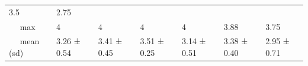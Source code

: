 \documentclass[
  english,
  man,floatsintext]{apa6}
\begin{document}
\begin{longtable}[]{@{}lllllll@{}}
\begin{minipage}[t]{0.11\columnwidth}
3.5\strut
\end{minipage} & \begin{minipage}[t]{0.11\columnwidth}\raggedright
2.75\strut
\end{minipage}\tabularnewline
\begin{minipage}[t]{0.16\columnwidth}\raggedright
~~ max\strut
\end{minipage} & \begin{minipage}[t]{0.11\columnwidth}\raggedright
4\strut
\end{minipage} & \begin{minipage}[t]{0.11\columnwidth}\raggedright
4\strut
\end{minipage} & \begin{minipage}[t]{0.11\columnwidth}\raggedright
4\strut
\end{minipage} & \begin{minipage}[t]{0.11\columnwidth}\raggedright
4\strut
\end{minipage} & \begin{minipage}[t]{0.11\columnwidth}\raggedright
3.88\strut
\end{minipage} & \begin{minipage}[t]{0.11\columnwidth}\raggedright
3.75\strut
\end{minipage}\tabularnewline
\begin{minipage}[t]{0.16\columnwidth}\raggedright
~~ mean (sd)\strut
\end{minipage} & \begin{minipage}[t]{0.11\columnwidth}\raggedright
3.26 ± 0.54\strut
\end{minipage} & \begin{minipage}[t]{0.11\columnwidth}\raggedright
3.41 ± 0.45\strut
\end{minipage} & \begin{minipage}[t]{0.11\columnwidth}\raggedright
3.51 ± 0.25\strut
\end{minipage} & \begin{minipage}[t]{0.11\columnwidth}\raggedright
3.14 ± 0.51\strut
\end{minipage} & \begin{minipage}[t]{0.11\columnwidth}\raggedright
3.38 ± 0.40\strut
\end{minipage} & \begin{minipage}[t]{0.11\columnwidth}\raggedright
2.95 ± 0.71\strut
\end{minipage}\tabularnewline
\bottomrule
\end{longtable}
\end{document}
